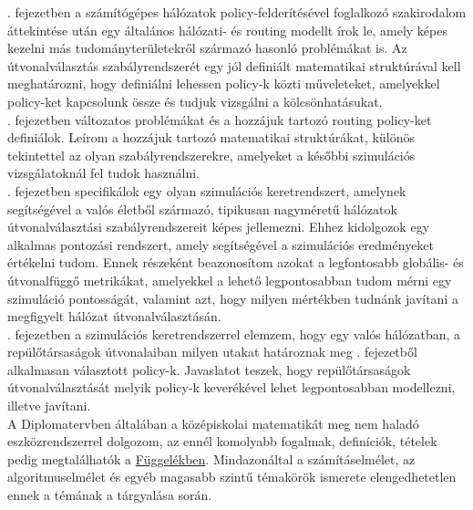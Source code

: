 . fejezetben a számítógépes hálózatok policy-felderítésével foglalkozó szakirodalom áttekintése után egy általános hálózati- és routing modellt írok le, amely képes kezelni más tudományterületekről származó hasonló problémákat is. Az útvonalválasztás szabályrendszerét egy jól definiált matematikai struktúrával kell meghatározni, hogy definiálni lehessen policy-k közti műveleteket, amelyekkel policy-ket kapcsolunk össze és tudjuk vizsgálni a kölcsönhatásukat.\\

. fejezetben változatos problémákat és a hozzájuk tartozó routing policy-ket definiálok. Leírom a hozzájuk tartozó matematikai struktúrákat, különös tekintettel az olyan szabályrendszerekre, amelyeket a későbbi szimulációs vizsgálatoknál fel tudok használni.\\

. fejezetben specifikálok egy olyan szimulációs keretrendszert, amelynek segítségével a valós életből származó, tipikusan nagyméretű hálózatok útvonalválasztási szabályrendszereit képes jellemezni. Ehhez kidolgozok egy alkalmas pontozási rendszert, amely segítségével a szimulációs eredményeket értékelni tudom. Ennek részeként beazonosítom azokat a legfontosabb globális- és útvonalfüggő metrikákat, amelyekkel a lehető legpontosabban tudom mérni egy szimuláció pontosságát, valamint azt, hogy milyen mértékben tudnánk javítani a megfigyelt hálózat útvonalválasztásán.\\

. fejezetben a szimulációs keretrendszerrel elemzem, hogy egy valós hálózatban, a repülőtársaságok útvonalaiban milyen utakat határoznak meg . fejezetből alkalmasan választott policy-k. Javaslatot teszek, hogy repülőtársaságok útvonalválasztását melyik policy-k keverékével lehet legpontosabban modellezni, illetve javítani.\\

A Diplomatervben általában a középiskolai matematikát meg nem haladó eszközrendszerrel dolgozom, az ennél komolyabb fogalmak, definíciók, tételek pedig megtalálhatók a \hyperlink{appendix}{Függelékben}. Mindazonáltal a számításelmélet, az algoritmuselmélet és egyéb magasabb szintű témakörök ismerete elengedhetetlen ennek a témának a tárgyalása során.
